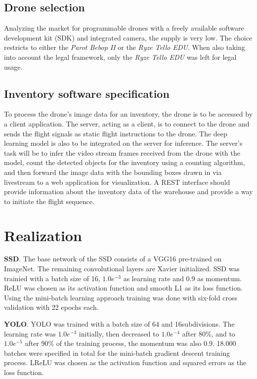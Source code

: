 \documentclass[a4paper, 10pt, journal]{wissarbIEEE}      %
\begin{document}
\subsection{Drone selection}

Analyzing the market for programmable drones with a freely available software development kit (SDK) and integrated camera, the supply is very low. The choice restricts to either the \textit{Parot Bebop II} or the \textit{Ryze Tello EDU}. When also taking into account the legal framework, only the \textit{Ryze Tello EDU} was left for legal usage.

\subsection{Inventory software specification}

To process the drone's image data for an inventory, the drone is to be accessed by a client application. The server, acting as a client, is to connect to the drone and sends the flight signals as static flight instructions to the drone. The deep learning model is also to be integrated on the server for inference. The server's task will be to infer the video stream frames received from the drone with the model, count the detected objects for the inventory using a counting algorithm, and then forward the image data with the bounding boxes drawn in via livestream to a web application for visualization. A REST interface should provide information about the inventory data of the warehouse and provide a way to initiate the flight sequence.

\section{Realization}

\textbf{SSD}. The base network of the SSD consists of a VGG16 pre-trained on ImageNet. The remaining convolutional layers are Xavier initialized. SSD was trainied with a batch size of 16, $1.0e^{-3}$ as learning rate and 0.9 as momentum. ReLU was chosen as its activation function and smooth L1 as its loss function. Using the mini-batch learning approach training was done with six-fold cross validation with 22 epochs each.

\textbf{YOLO}. YOLO was trained with a batch size of 64 and 16subdivisions. The learning rate was $1.0e^{-3}$ initially, then decreased to $1.0e^{-4}$ after 80\%, and to $1.0e^{-5}$ after 90\% of the training process, the momentum was also 0.9. 18.000 batches were specified in total for the mini-batch gradient descent training process. LReLU was chosen as the activation function and squared errors as the loss function.
\end{document}
